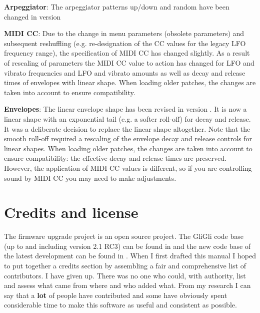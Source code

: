 \documentclass[landscape, 11pt, oneside, twoside]{report}
\newenvironment{flowtext}{\addmargin[0cm]{0cm}}{\endaddmargin} %
\begin{document}
\begin{flowtext}
\textbf{Arpeggiator}: The arpeggiator patterns up/down and random have been changed in version \version

\textbf{MIDI CC}: Due to the change in menu parameters (obsolete parameters) and subsequent reshuffling (e.g. re-designation of the CC values for the legacy LFO frequency range), the specification of MIDI CC has changed slightly. As a result of rescaling of parameters the MIDI CC value to action has changed for LFO and vibrato frequencies and LFO and vibrato amounts as well as decay and release times of envelopes with linear shape. When loading older patches, the changes are taken into account to ensure compatibility.

\textbf{Envelopes}: The linear envelope shape has been revised in version \version. It is now a linear shape with an exponential tail (e.g. a softer roll-off) for decay and release. It was a deliberate decision to replace the linear shape altogether. Note that the smooth roll-off required a rescaling of the envelope decay and release controls for linear shapes. When loading older patches, the changes are taken into account to ensure compatibility: the effective decay and release times are preserved. However, the application of MIDI CC values is different, so if you are controlling sound by MIDI CC you may need to make adjustments.

\section{Credits and license}

The firmware upgrade project is an open source project. The GliGli code base (up to and including version 2.1 RC3) can be found in \cite{gligli} and the new code base of the latest development can be found in \cite{imogen}. When I first drafted this manual I hoped to put together a credits section by assembling a fair and comprehensive list of contributors. I have given up. There was no one who could, with authority, list and assess what came from where and who added what. From my research I can say that a \textbf{lot} of people have contributed and some have obviously spent considerable time to make this software as useful and consistent as possible. 


\end{flowtext}
\end{document}
